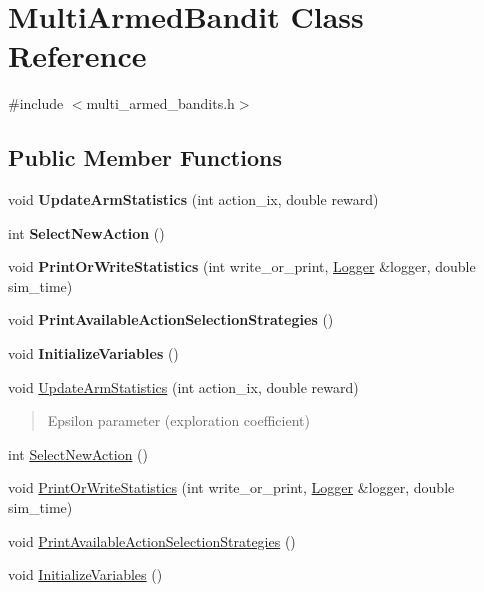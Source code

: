 \hypertarget{classMultiArmedBandit}{}\section{Multi\+Armed\+Bandit Class Reference}
\label{classMultiArmedBandit}


{\ttfamily \#include $<$multi\+\_\+armed\+\_\+bandits.\+h$>$}

\subsection*{Public Member Functions}
\begin{DoxyCompactItemize}
\item 
\mbox{\label{classMultiArmedBandit_a88a82de9923f34c3baaa1c861a6b6e0d}} 
void {\bfseries Update\+Arm\+Statistics} (int action\+\_\+ix, double reward)
\item 
\mbox{\label{classMultiArmedBandit_aedb817a8d802c8430a16faae3ef4589f}} 
int {\bfseries Select\+New\+Action} ()
\item 
\mbox{\label{classMultiArmedBandit_a67fa6b49c9a05bfc2b4878c662620629}} 
void {\bfseries Print\+Or\+Write\+Statistics} (int write\+\_\+or\+\_\+print, \hyperlink{structLogger}{Logger} \&logger, double sim\+\_\+time)
\item 
\mbox{\label{classMultiArmedBandit_a46bc31936937db05b94710c4699ac150}} 
void {\bfseries Print\+Available\+Action\+Selection\+Strategies} ()
\item 
\mbox{\label{classMultiArmedBandit_af12dc69340c04afff52e3e7fbf00d8d1}} 
void {\bfseries Initialize\+Variables} ()
\item 
void \hyperlink{classMultiArmedBandit_a88a82de9923f34c3baaa1c861a6b6e0d}{Update\+Arm\+Statistics} (int action\+\_\+ix, double reward)
\begin{DoxyCompactList}\small\item\em \begin{quote}
Epsilon parameter (exploration coefficient) \end{quote}
\end{DoxyCompactList}\item 
int \hyperlink{classMultiArmedBandit_aedb817a8d802c8430a16faae3ef4589f}{Select\+New\+Action} ()
\item 
void \hyperlink{classMultiArmedBandit_a67fa6b49c9a05bfc2b4878c662620629}{Print\+Or\+Write\+Statistics} (int write\+\_\+or\+\_\+print, \hyperlink{structLogger}{Logger} \&logger, double sim\+\_\+time)
\item 
void \hyperlink{classMultiArmedBandit_a46bc31936937db05b94710c4699ac150}{Print\+Available\+Action\+Selection\+Strategies} ()
\item 
void \hyperlink{classMultiArmedBandit_af12dc69340c04afff52e3e7fbf00d8d1}{Initialize\+Variables} ()
\end{DoxyCompactItemize}
